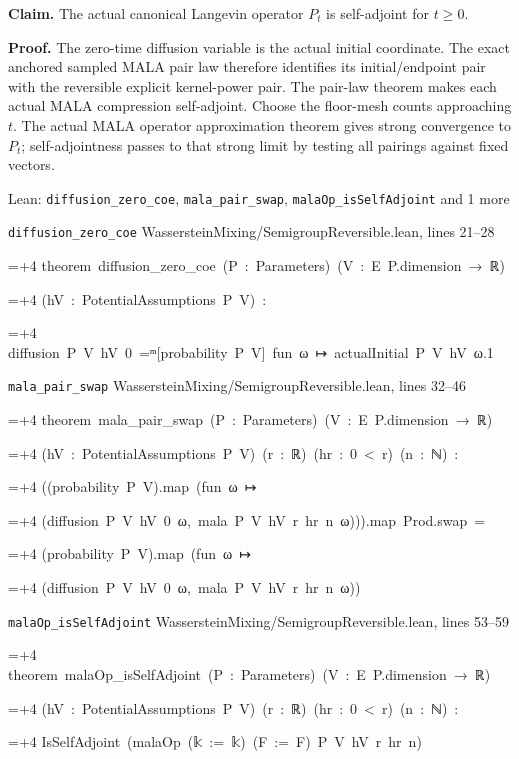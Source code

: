 \documentclass[11pt,a4paper]{report}
\newlength{\leancharwidth}
\newenvironment{leancode}{\par\smallskip\begingroup\ttfamily\footnotesize\raggedright
  \settowidth{\leancharwidth}{M}\setlength{\parskip}{0pt}\setlength{\parindent}{0pt}
  \frenchspacing}{\par\endgroup\smallskip}
\newcommand{\leanline}[2]{\hangindent=\dimexpr#1\leancharwidth+4\leancharwidth\relax
  \hangafter=1\noindent\hspace*{#1\leancharwidth}#2\par}
\newcommand{\leansource}[1]{\par{\footnotesize\color{leanmuted}#1}\par}
\begin{document}
\textbf{Claim.} The actual canonical Langevin operator \(P_t\) is self-adjoint for \(t\ge0\).



\textbf{Proof.} The zero-time diffusion variable is the actual initial coordinate. The exact anchored sampled MALA pair law therefore identifies its initial/\allowbreak{}endpoint pair with the reversible explicit kernel-power pair. The pair-law theorem makes each actual MALA compression self-adjoint. Choose the floor-mesh counts approaching \(t\). The actual MALA operator approximation theorem gives strong convergence to \(P_t\); self-adjointness passes to that strong limit by testing all pairings against fixed vectors.

\begin{leanbox}{Lean: \texttt{diffusion\_\allowbreak{}zero\_\allowbreak{}coe}, \texttt{mala\_\allowbreak{}pair\_\allowbreak{}swap}, \texttt{malaOp\_\allowbreak{}isSelfAdjoint} and 1 more}
\leansource{\texttt{diffusion\_\allowbreak{}zero\_\allowbreak{}coe} \quad WassersteinMixing/\allowbreak{}SemigroupReversible.lean, lines 21–28}
\begin{leancode}
\leanline{0}{theorem\ diffusion\_zero\_coe\ (P\ :\ Parameters)\ (V\ :\ E\ P.dimension\ →\ ℝ)}
\leanline{4}{(hV\ :\ PotentialAssumptions\ P\ V)\ :}
\leanline{4}{diffusion\ P\ V\ hV\ 0\ =ᵐ[probability\ P\ V]\ fun\ ω\ ↦\ actualInitial\ P\ V\ hV\ ω.1}
\end{leancode}
\leansource{\texttt{mala\_\allowbreak{}pair\_\allowbreak{}swap} \quad WassersteinMixing/\allowbreak{}SemigroupReversible.lean, lines 32–46}
\begin{leancode}
\leanline{0}{theorem\ mala\_pair\_swap\ (P\ :\ Parameters)\ (V\ :\ E\ P.dimension\ →\ ℝ)}
\leanline{4}{(hV\ :\ PotentialAssumptions\ P\ V)\ (r\ :\ ℝ)\ (hr\ :\ 0\ <\ r)\ (n\ :\ ℕ)\ :}
\leanline{4}{((probability\ P\ V).map\ (fun\ ω\ ↦}
\leanline{6}{(diffusion\ P\ V\ hV\ 0\ ω,\ mala\ P\ V\ hV\ r\ hr\ n\ ω))).map\ Prod.swap\ =}
\leanline{6}{(probability\ P\ V).map\ (fun\ ω\ ↦}
\leanline{8}{(diffusion\ P\ V\ hV\ 0\ ω,\ mala\ P\ V\ hV\ r\ hr\ n\ ω))}
\end{leancode}
\leansource{\texttt{malaOp\_\allowbreak{}isSelfAdjoint} \quad WassersteinMixing/\allowbreak{}SemigroupReversible.lean, lines 53–59}
\begin{leancode}
\leanline{0}{theorem\ malaOp\_isSelfAdjoint\ (P\ :\ Parameters)\ (V\ :\ E\ P.dimension\ →\ ℝ)}
\leanline{4}{(hV\ :\ PotentialAssumptions\ P\ V)\ (r\ :\ ℝ)\ (hr\ :\ 0\ <\ r)\ (n\ :\ ℕ)\ :}
\leanline{4}{IsSelfAdjoint\ (malaOp\ ({\leanfallback 𝕜}\ :=\ {\leanfallback 𝕜})\ (F\ :=\ F)\ P\ V\ hV\ r\ hr\ n)}

\end{leancode}
\end{leanbox}
\end{document}
